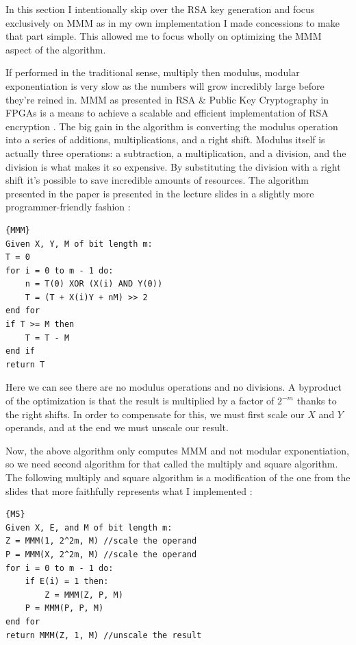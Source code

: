 \documentclass[12pt]{article}
\begin{document}
In this section I intentionally skip over the RSA key generation and focus exclusively on MMM as in my own implementation I made concessions to make that part simple. This allowed me to focus wholly on optimizing the MMM aspect of the algorithm.

If performed in the traditional sense, multiply then modulus, modular exponentiation is very slow as the numbers will grow incredibly large before they're reined in. MMM as presented in RSA \& Public Key Cryptography in FPGAs is a means to achieve a scalable and efficient implementation of RSA encryption \cite{RSA}. The big gain in the algorithm is converting the modulus operation into a series of additions, multiplications, and a right shift. Modulus itself is actually three operations: a subtraction, a multiplication, and a division, and the division is what makes it so expensive. By substituting the division with a right shift it's possible to save incredible amounts of resources. The algorithm presented in the paper is presented in the lecture slides in a slightly more programmer-friendly fashion \cite{Slides}:

\begin{minipage}{0.5\textwidth}
\begin{lstlisting}[caption=Montgomery Modular Multiplication,frame=tlrb]{MMM}
Given X, Y, M of bit length m:
T = 0
for i = 0 to m - 1 do:
    n = T(0) XOR (X(i) AND Y(0))
    T = (T + X(i)Y + nM) >> 2
end for
if T >= M then
    T = T - M
end if
return T
\end{lstlisting}
\end{minipage}

Here we can see there are no modulus operations and no divisions. A byproduct of the optimization is that the result is multiplied by a factor of $2^{-m}$ thanks to the right shifts. In order to compensate for this, we must first scale our $X$ and $Y$ operands, and at the end we must unscale our result. 

Now, the above algorithm only computes MMM and not modular exponentiation, so we need second algorithm for that called the multiply and square algorithm. The following multiply and square algorithm is a modification of the one from the slides that more faithfully represents what I implemented \cite{Slides}: 

\begin{minipage}{.65\textwidth}
\begin{lstlisting}[caption=Multiply and Square,frame=tlrb]{MS}
Given X, E, and M of bit length m:
Z = MMM(1, 2^2m, M) //scale the operand
P = MMM(X, 2^2m, M) //scale the operand
for i = 0 to m - 1 do:
    if E(i) = 1 then:
        Z = MMM(Z, P, M)
    P = MMM(P, P, M)
end for
return MMM(Z, 1, M) //unscale the result
\end{lstlisting}
\end{minipage}
\end{document}
